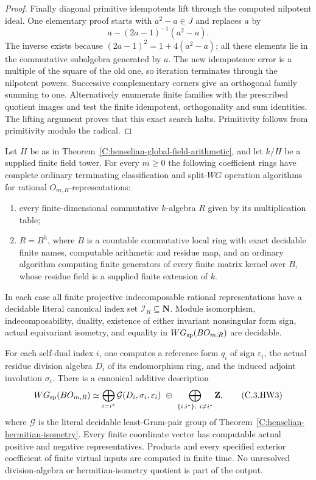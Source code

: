 \begin{proof}
Finally diagonal primitive idempotents
lift through the computed nilpotent
ideal.  One elementary proof starts
with $a^2-a\in J$ and replaces $a$ by
\[
              a-(2a-1)^{-1}(a^2-a).
\]
The inverse exists because
$(2a-1)^2=1+4(a^2-a)$; all these
elements lie in the commutative
subalgebra generated by $a$.
The new idempotence error is a
multiple of the square of the old
one, so iteration terminates through
the nilpotent powers.
Successive complementary corners
give an orthogonal family summing
to one.  Alternatively enumerate
finite families with the prescribed
quotient images and test the finite
idempotent, orthogonality and sum
identities.  The lifting argument
proves that this exact search halts.
Primitivity follows from primitivity
modulo the radical.
\end{proof}

\begin{theorem}
\label{C:henselian-global-coefficient-WG}
Let $H$ be as in
Theorem~\ref{C:henselian-global-field-arithmetic},
and let $k/H$ be a supplied finite field tower.
For every $m\geq0$ the following coefficient
rings have complete ordinary terminating
classification and split-$WG$ operation
algorithms for rational $O_{m,R}$-representations:
\begin{enumerate}
\item every finite-dimensional commutative
$k$-algebra $R$ given by its multiplication
table;
\item $R=B^h$, where $B$ is a countable
commutative local ring with exact decidable
finite names, computable arithmetic and
residue map, and an ordinary algorithm
computing finite generators of every
finite matrix kernel over $B$, whose
residue field is a supplied finite
extension of $k$.
\end{enumerate}
In each case all finite projective
indecomposable rational representations
have a decidable literal canonical
index set $\mathscr I_R\subseteq\mathbf N$.
Module isomorphism, indecomposability,
duality, existence of either invariant
nonsingular form sign, actual equivariant
isometry, and equality in
$WG_{\rm sp}(BO_{m,R})$ are decidable.

For each self-dual index $i$, one computes
a reference form $q_i$ of sign
$\varepsilon_i$, the actual residue
division algebra $D_i$ of its
endomorphism ring, and the induced
adjoint involution $\sigma_i$.
There is a canonical additive description
\[
 WG_{\rm sp}(BO_{m,R})\simeq
 \bigoplus_{i=i^*}\mathcal G(D_i,\sigma_i,\varepsilon_i)
 \ \oplus\
 \bigoplus_{\{i,i^*\},\ i\ne i^*}\mathbf Z,              \tag{C.3.HW3}
\]
where $\mathcal G$ is the literal
decidable least-Gram-pair group of
Theorem~\ref{C:henselian-hermitian-isometry}.
Every finite coordinate vector has
computable actual positive and negative
representatives.
Products and every specified exterior
coefficient of finite virtual inputs
are computed in finite time.
No unresolved division-algebra or
hermitian-isometry quotient is part
of the output.
\end{theorem}
